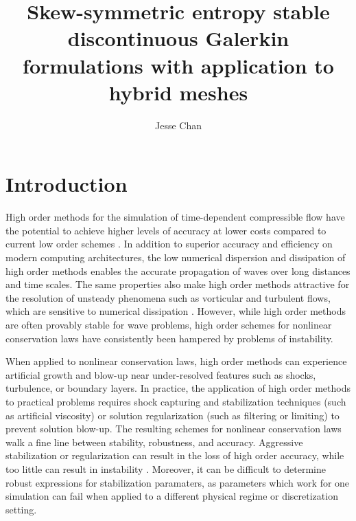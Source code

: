 \documentclass[review]{siamart0216}
\date{}
\author{Jesse Chan}
\title{Skew-symmetric entropy stable discontinuous Galerkin formulations with application to hybrid meshes }
\theoremstyle{assumption}
\begin{document}
\maketitle

%
%


\section{Introduction}

High order methods for the simulation of time-dependent compressible flow have the potential to achieve higher levels of accuracy at lower costs compared to current low order schemes \cite{wang2013high}.  In addition to superior accuracy and efficiency on modern computing architectures, the low numerical dispersion and dissipation of high order methods \cite{ainsworth2004dispersive} enables the accurate propagation of waves over long distances and time scales.  The same properties also make high order methods attractive for the resolution of unsteady phenomena such as vorticular and turbulent flows, which are sensitive to numerical dissipation \cite{visbal1999high, wang2013high}.  However, while high order methods are often provably stable for wave problems, high order schemes for nonlinear conservation laws have consistently been hampered by problems of instability.  

When applied to nonlinear conservation laws, high order methods can experience artificial growth and blow-up near under-resolved features such as shocks, turbulence, or boundary layers.  In practice, the application of high order methods to practical problems requires shock capturing and stabilization techniques (such as artificial viscosity) or solution regularization (such as filtering or limiting) to prevent solution blow-up.  The resulting schemes for nonlinear conservation laws walk a fine line between stability, robustness, and accuracy.  Aggressive stabilization or regularization can result in the loss of high order accuracy, while too little can result in instability \cite{wang2013high}.  Moreover, it can be difficult to determine robust expressions for stabilization paramaters, as parameters which work for one simulation can fail when applied to a different physical regime or discretization setting.  
\end{document}
